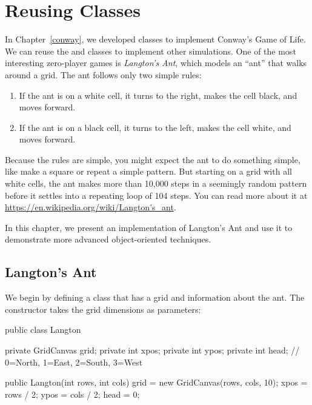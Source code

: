 \chapter{Reusing Classes}
\label{reusing-classes}

In Chapter~\ref{conway}, we developed classes to implement Conway's Game of Life.
We can reuse the  and  classes to implement other simulations.
One of the most interesting zero-player games is {\it Langton's Ant}, which models an ``ant'' that walks around a grid.
The ant follows only two simple rules:

\begin{enumerate}
\item If the ant is on a white cell, it turns to the right, makes the cell black, and moves forward.
\item If the ant is on a black cell, it turns to the left, makes the cell white, and moves forward.
\end{enumerate}

Because the rules are simple, you might expect the ant to do something simple, like make a square or repeat a simple pattern.
But starting on a grid with all white cells, the ant makes more than 10,000 steps in a seemingly random pattern before it settles into a repeating loop of 104 steps.
You can read more about it at \url{https://en.wikipedia.org/wiki/Langton's_ant}.


In this chapter, we present an implementation of Langton's Ant and use it to demonstrate more advanced object-oriented techniques.


\section{Langton's Ant}
\label{reusing-classes_langtons-ant}

We begin by defining a  class that has a grid and information about the ant.
The constructor takes the grid dimensions as parameters:

\begin{code}
public class Langton {
    private GridCanvas grid;
    private int xpos;
    private int ypos;
    private int head; // 0=North, 1=East, 2=South, 3=West

    public Langton(int rows, int cols) {
        grid = new GridCanvas(rows, cols, 10);
        xpos = rows / 2;
        ypos = cols / 2;
        head = 0;
    }
}
\end{code}

